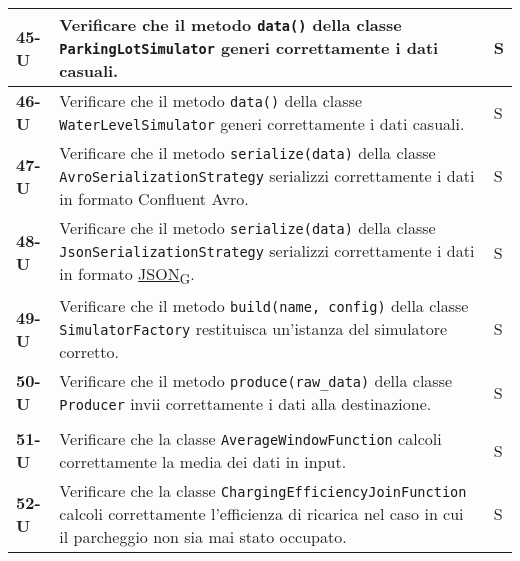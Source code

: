 \begin{longtable}{|>{\raggedright\arraybackslash}m{}|>{\raggedright\arraybackslash}m{}|>{\raggedright\arraybackslash}m{}|}
	\hline
	\textbf{45-U}   & Verificare che il metodo \texttt{data()} della classe \texttt{ParkingLotSimulator} generi correttamente i dati casuali.                                                                                                                          & S              \\
	\hline
	\textbf{46-U}   & Verificare che il metodo \texttt{data()} della classe \texttt{WaterLevelSimulator} generi correttamente i dati casuali.                                                                                                                          & S              \\
	\hline
	\textbf{47-U}   & Verificare che il metodo \texttt{serialize(data)} della classe \texttt{AvroSerializationStrategy} serializzi correttamente i dati in formato Confluent Avro.                                                                                     & S              \\
	\hline
	\textbf{48-U}   & Verificare che il metodo \texttt{serialize(data)} della classe \texttt{JsonSerializationStrategy} serializzi correttamente i dati in formato \href{https://7last.github.io/docs/pb/documentazione-interna/glossario\#javascript-object-notation}{JSON\textsubscript{G}}.                                                                                               & S              \\
	\hline
	\textbf{49-U}   & Verificare che il metodo \texttt{build(name, config)} della classe \texttt{SimulatorFactory} restituisca un'istanza del simulatore corretto.                                                                                                     & S              \\
	\hline
	\textbf{50-U}   & Verificare che il metodo \texttt{produce(raw\_data)} della classe \texttt{Producer} invii correttamente i dati alla destinazione.                                                                                                                & S              \\
	\hline
	\multicolumn{3}{|c|}{\textbf{Apache Flink}} \\
	\hline
	\textbf{51-U}   & Verificare che la classe \texttt{AverageWindowFunction} calcoli correttamente la media dei dati in input.                                                                                                                                        & S              \\
	\hline
	\textbf{52-U}   & Verificare che la classe \texttt{ChargingEfficiencyJoinFunction} calcoli correttamente l'efficienza di ricarica nel caso in cui il parcheggio non sia mai stato occupato.                                                                        & S              \\

\end{longtable}
